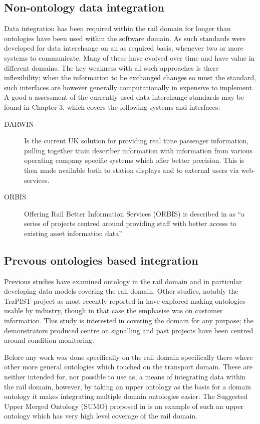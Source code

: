 \subsection{Non-ontology data integration}
Data integration has been required within the rail domain for longer than ontologies have been used within the software domain. As such standards were developed for data interchange on an as required basis, whenever two or more systems to communicate. Many of these have evolved over time and have value in different domains. The key weakness with all such approaches is there inflexibility; when the information to be exchanged changes so must the standard, such interfaces are however generally computationally in expensive to implement. A good a assessment of the currently used data interchange standards may be found in \cite{Tutcher2015} Chapter 3, which covers the following systems and interfaces:
\begin{description}
    \item[DARWIN] Is the current UK solution for providing real time passenger information, pulling together train describer information with information from various operating company specific systems which offer better precision. This is then made available both to station displays and to external users via web-services.
    \item[ORBIS] Offering Rail Better Information Services (ORBIS) is described in \cite{Tutcher2015}  as ``a series of projects centred around providing staff with better access to existing asset information data''
\end{description}



\subsection{Prevous ontologies based integration}
Previous studies have examined ontology in the rail domain and in particular developing data models covering the rail domain. Other studies, notably the TraPIST project as most recently reported in \cite{Bhatti2016} have explored making ontologies usable by industry, though in that case the emphasise was on customer information. This study is interested in covering the domain for any purpose; the demonstrators produced centre on signalling and past projects have been centred around condition monitoring.

Before any work was done specifically on the rail domain specifically there where other more general ontologies which touched on the transport domain. These are neither intended for, nor possible to use as, a means of integrating data within the rail domain, however, by taking an upper ontology as the basis for a domain ontology it makes integrating multiple domain ontologies easier. The Suggested Upper Merged Ontology (SUMO) proposed in \cite{Niles2001} is an example of such an upper ontology which has very high level coverage of the rail domain.


